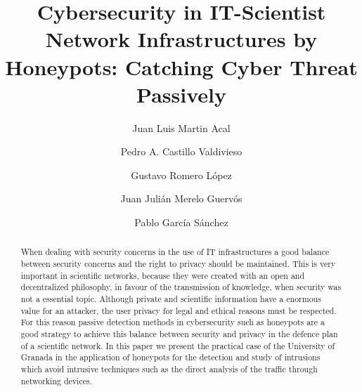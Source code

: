 \documentclass[a4paper]{llncs}
\begin{document}
	
	\pagestyle{empty}
	
	\mainmatter
	
	\title{Cybersecurity in IT-Scientist Network Infrastructures by
		Honeypots: Catching Cyber Threat Passively}
	
	\author{Juan Luis Martin Acal \and Pedro A. Castillo Valdivieso
		\and Gustavo Romero López \and Juan Julián Merelo Guervós \and Pablo García Sánchez }
	
	
	
	\maketitle

\begin{abstract}
When dealing with security concerns in the use of IT infrastructures a good balance between security concerns and the right to privacy should be maintained. This is very important in scientific networks, because they were created with an open and decentralized philosophy, in favour of the transmission of knowledge, when security was not a essential topic.
Although private and scientific information have a enormous value for an attacker, the user privacy for legal and ethical reasons must be respected. For this reason passive detection methods in cybersecurity such as honeypots are a good strategy to achieve this balance between security and privacy in the defence plan of a scientific network. In this paper we present the practical case of the University of Granada in the application of honeypots for the detection and study of intrusions which avoid intrusive techniques such as the direct analysis of the traffic through networking devices. 
\end{abstract}
\end{document}
